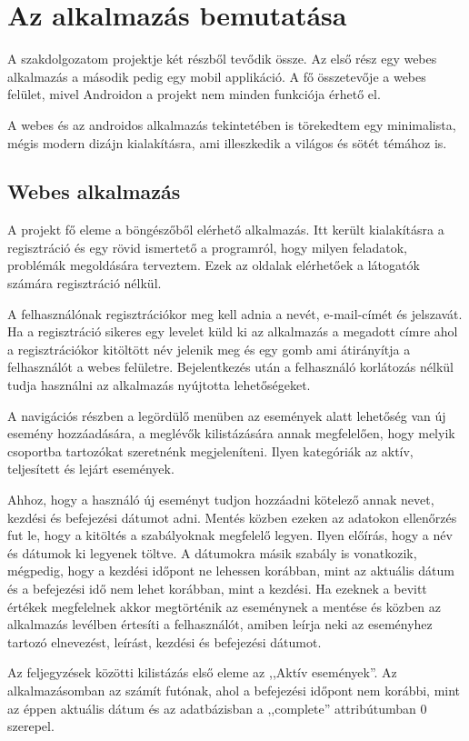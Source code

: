 \documentclass[
]{thesis-ekf}
\theoremstyle{definition}
\theoremstyle{remark}
\begin{document}
	\chapter{Az alkalmazás bemutatása}
	A szakdolgozatom projektje két részből tevődik össze. Az első rész egy webes alkalmazás a második pedig egy mobil applikáció. A fő összetevője a webes felület, mivel Androidon a projekt nem minden funkciója érhető el. 
	
	A webes és az androidos alkalmazás tekintetében is törekedtem egy minimalista, mégis modern dizájn kialakításra, ami illeszkedik a világos és sötét témához is.
	
	\section{Webes alkalmazás}
	A projekt fő eleme a böngészőből elérhető alkalmazás. Itt került kialakításra a regisztráció és egy rövid ismertető a programról, hogy milyen feladatok, problémák megoldására terveztem. Ezek az oldalak elérhetőek a látogatók számára regisztráció nélkül. 
	
	A felhasználónak regisztrációkor meg kell adnia a nevét, e-mail-címét és jelszavát. Ha a regisztráció sikeres egy levelet küld ki az alkalmazás a megadott címre ahol a regisztrációkor kitöltött név jelenik meg és egy gomb ami átirányítja a felhasználót a webes felületre. Bejelentkezés után a felhasználó korlátozás nélkül tudja használni az alkalmazás nyújtotta lehetőségeket. 
	
	A navigációs részben a legördülő menüben az események alatt lehetőség van új esemény hozzáadására, a meglévők kilistázására annak megfelelően, hogy melyik csoportba tartozókat szeretnénk megjeleníteni. Ilyen kategóriák az aktív, teljesített és lejárt események. 
	
	Ahhoz, hogy a használó új eseményt tudjon hozzáadni kötelező annak nevet, kezdési és befejezési dátumot adni. Mentés közben ezeken az adatokon ellenőrzés fut le, hogy a kitöltés a szabályoknak megfelelő legyen. Ilyen előírás, hogy a név és dátumok ki legyenek töltve. A dátumokra másik szabály is vonatkozik, mégpedig, hogy a kezdési időpont ne lehessen korábban, mint az aktuális dátum és a befejezési idő nem lehet korábban, mint a kezdési. Ha ezeknek a bevitt értékek megfelelnek akkor megtörténik az eseménynek a mentése és közben az alkalmazás levélben értesíti a felhasználót, amiben leírja neki az eseményhez tartozó elnevezést, leírást, kezdési és befejezési dátumot. 
	
	Az feljegyzések közötti kilistázás első eleme az ,,Aktív események''. Az alkalmazásomban az számít futónak, ahol a befejezési időpont nem korábbi, mint az éppen aktuális dátum és az adatbázisban a ,,complete''  attribútumban 0 szerepel.
	
\end{document}
